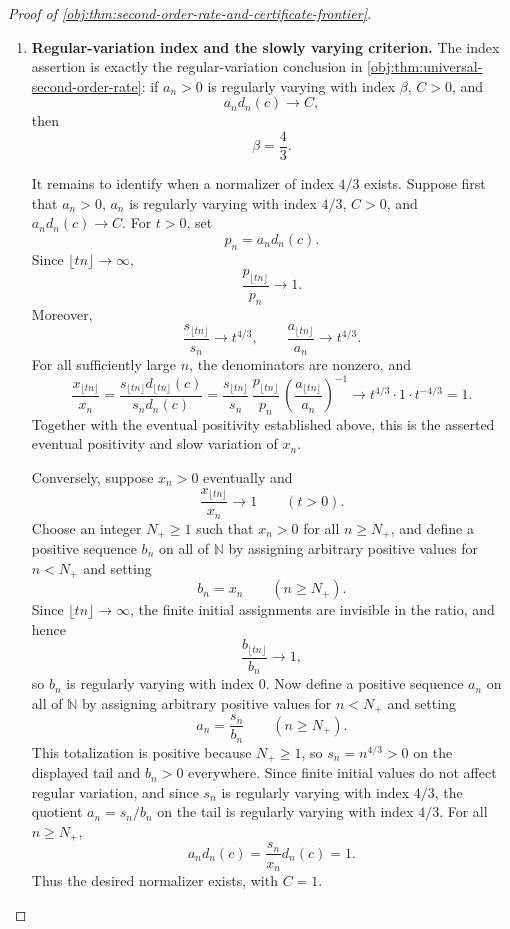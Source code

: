 \documentclass[11pt]{article}
\begin{document}
\begin{proof}[Proof of \cref{obj:thm:second-order-rate-and-certificate-frontier}]
\begin{enumerate}
\item \textbf{Regular-variation index and the slowly varying criterion.}
The index assertion is exactly the regular-variation conclusion in \cref{obj:thm:universal-second-order-rate}: if \(a_n>0\) is regularly varying with index \(\beta\), \(C>0\), and
\[
a_n d_n(c)\to C,
\]
then
\[
\beta=\frac43.
\]

It remains to identify when a normalizer of index \(4/3\) exists. Suppose first that \(a_n>0\), \(a_n\) is regularly varying with index \(4/3\), \(C>0\), and \(a_n d_n(c)\to C\). For \(t>0\), set
\[
p_n=a_n d_n(c).
\]
Since \(\lfloor tn\rfloor\to\infty\),
\[
\frac{p_{\lfloor tn\rfloor}}{p_n}\to1.
\]
Moreover,
\[
\frac{s_{\lfloor tn\rfloor}}{s_n}\to t^{4/3},
\qquad
\frac{a_{\lfloor tn\rfloor}}{a_n}\to t^{4/3}.
\]
For all sufficiently large \(n\), the denominators are nonzero, and
\[
\frac{x_{\lfloor tn\rfloor}}{x_n}
=
\frac{s_{\lfloor tn\rfloor}d_{\lfloor tn\rfloor}(c)}
{s_nd_n(c)}
=
\frac{s_{\lfloor tn\rfloor}}{s_n}\,
\frac{p_{\lfloor tn\rfloor}}{p_n}\,
\left(\frac{a_{\lfloor tn\rfloor}}{a_n}\right)^{-1}
\longrightarrow
t^{4/3}\cdot1\cdot t^{-4/3}=1.
\]
Together with the eventual positivity established above, this is the asserted eventual positivity and slow variation of \(x_n\).

Conversely, suppose \(x_n>0\) eventually and
\[
\frac{x_{\lfloor tn\rfloor}}{x_n}\to1
\qquad(t>0).
\]
Choose an integer \(N_+\ge1\) such that \(x_n>0\) for all \(n\ge N_+\), and define a positive sequence \(b_n\) on all of \(\mathbb N\) by assigning arbitrary positive values for \(n<N_+\) and setting
\[
b_n=x_n
\qquad(n\ge N_+).
\]
Since \(\lfloor tn\rfloor\to\infty\), the finite initial assignments are invisible in the ratio, and hence
\[
\frac{b_{\lfloor tn\rfloor}}{b_n}\to1,
\]
so \(b_n\) is regularly varying with index \(0\). Now define a positive sequence \(a_n\) on all of \(\mathbb N\) by assigning arbitrary positive values for \(n<N_+\) and setting
\[
a_n=\frac{s_n}{b_n}
\qquad(n\ge N_+).
\]
This totalization is positive because \(N_+\ge1\), so \(s_n=n^{4/3}>0\) on the displayed tail and \(b_n>0\) everywhere. Since finite initial values do not affect regular variation, and since \(s_n\) is regularly varying with index \(4/3\), the quotient \(a_n=s_n/b_n\) on the tail is regularly varying with index \(4/3\). For all \(n\ge N_+\),
\[
a_n d_n(c)
=
\frac{s_n}{x_n}d_n(c)
=
1.
\]
Thus the desired normalizer exists, with \(C=1\). %


\end{enumerate}
\end{proof}
\end{document}
